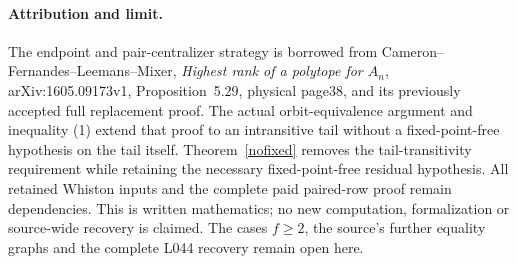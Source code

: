 \documentclass[11pt,a4paper]{article}
\begin{document}
\paragraph{Attribution and limit.}
The endpoint and pair-centralizer strategy is borrowed from
Cameron--Fernandes--Leemans--Mixer, \emph{Highest rank of a
polytope for $A_n$}, arXiv:1605.09173v1, Proposition~5.29,
physical page38, and its previously accepted full replacement
proof. The actual orbit-equivalence argument and inequality
(1) extend that proof to an intransitive tail without a
fixed-point-free hypothesis on the tail itself. Theorem~\ref{nofixed}
removes the tail-transitivity requirement while retaining the
necessary fixed-point-free residual hypothesis.
All retained Whiston inputs and the complete paid paired-row
proof remain dependencies. This is written mathematics; no
new computation, formalization or source-wide recovery is
claimed. The cases $f\geq2$, the source's further equality
graphs and the complete L044 recovery remain open here.
\end{document}
